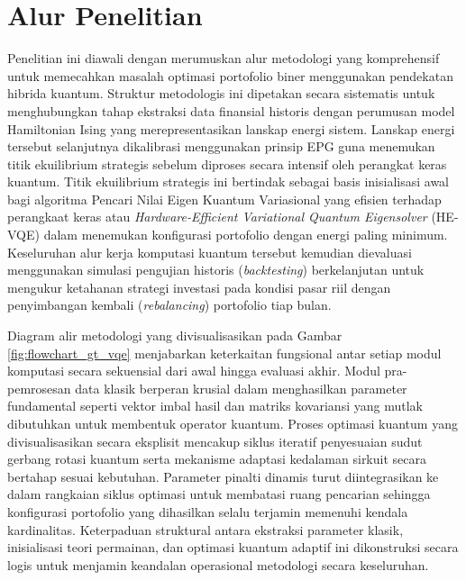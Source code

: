 \section{Alur Penelitian}
Penelitian ini diawali dengan merumuskan alur metodologi yang komprehensif untuk memecahkan masalah optimasi portofolio biner menggunakan pendekatan hibrida kuantum. Struktur metodologis ini dipetakan secara sistematis untuk menghubungkan tahap ekstraksi data finansial historis dengan perumusan model Hamiltonian Ising yang merepresentasikan lanskap energi sistem. Lanskap energi tersebut selanjutnya dikalibrasi menggunakan prinsip EPG guna menemukan titik ekuilibrium strategis sebelum diproses secara intensif oleh perangkat keras kuantum. Titik ekuilibrium strategis ini bertindak sebagai basis inisialisasi awal bagi algoritma Pencari Nilai Eigen Kuantum Variasional yang efisien terhadap perangkaat keras atau \textit{Hardware-Efficient Variational Quantum Eigensolver} (HE-VQE) dalam menemukan konfigurasi portofolio dengan energi paling minimum. Keseluruhan alur kerja komputasi kuantum tersebut kemudian dievaluasi menggunakan simulasi pengujian historis (\textit{backtesting}) berkelanjutan untuk mengukur ketahanan strategi investasi pada kondisi pasar riil dengan penyimbangan kembali (\textit{rebalancing}) portofolio tiap bulan.

Diagram alir metodologi yang divisualisasikan pada Gambar \ref{fig:flowchart_gt_vqe} menjabarkan keterkaitan fungsional antar setiap modul komputasi secara sekuensial dari awal hingga evaluasi akhir. Modul pra-pemrosesan data klasik berperan krusial dalam menghasilkan parameter fundamental seperti vektor imbal hasil dan matriks kovariansi yang mutlak dibutuhkan untuk membentuk operator kuantum. Proses optimasi kuantum yang divisualisasikan secara eksplisit mencakup siklus iteratif penyesuaian sudut gerbang rotasi kuantum serta mekanisme adaptasi kedalaman sirkuit secara bertahap sesuai kebutuhan. Parameter pinalti dinamis turut diintegrasikan ke dalam rangkaian siklus optimasi untuk membatasi ruang pencarian sehingga konfigurasi portofolio yang dihasilkan selalu terjamin memenuhi kendala kardinalitas. Keterpaduan struktural antara ekstraksi parameter klasik, inisialisasi teori permainan, dan optimasi kuantum adaptif ini dikonstruksi secara logis untuk menjamin keandalan operasional metodologi secara keseluruhan.


